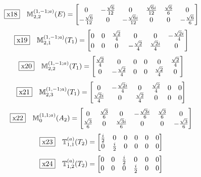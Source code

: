 \documentclass[fleqn,10pt,landscape]{jsarticle}
\begin{document}
\begin{dmath*}
\fbox{x18}\quad \mathbb{M}_{2,2}^{(1,-1;a)}(E)=\begin{bmatrix} 0 & - \frac{\sqrt{6}}{12} & 0 & \frac{\sqrt{6} i}{12} & \frac{\sqrt{6}}{6} & 0 \\ - \frac{\sqrt{6}}{12} & 0 & - \frac{\sqrt{6} i}{12} & 0 & 0 & - \frac{\sqrt{6}}{6} \end{bmatrix}
\end{dmath*}
\begin{dmath*}
\fbox{x19}\quad \mathbb{M}_{2,1}^{(1,-1;a)}(T_{1})=\begin{bmatrix} 0 & 0 & \frac{\sqrt{2}}{4} & 0 & 0 & - \frac{\sqrt{2} i}{4} \\ 0 & 0 & 0 & - \frac{\sqrt{2}}{4} & \frac{\sqrt{2} i}{4} & 0 \end{bmatrix}
\end{dmath*}
\begin{dmath*}
\fbox{x20}\quad \mathbb{M}_{2,2}^{(1,-1;a)}(T_{1})=\begin{bmatrix} \frac{\sqrt{2}}{4} & 0 & 0 & 0 & 0 & \frac{\sqrt{2}}{4} \\ 0 & - \frac{\sqrt{2}}{4} & 0 & 0 & \frac{\sqrt{2}}{4} & 0 \end{bmatrix}
\end{dmath*}
\begin{dmath*}
\fbox{x21}\quad \mathbb{M}_{2,3}^{(1,-1;a)}(T_{1})=\begin{bmatrix} 0 & - \frac{\sqrt{2} i}{4} & 0 & \frac{\sqrt{2}}{4} & 0 & 0 \\ \frac{\sqrt{2} i}{4} & 0 & \frac{\sqrt{2}}{4} & 0 & 0 & 0 \end{bmatrix}
\end{dmath*}
\begin{dmath*}
\fbox{x22}\quad \mathbb{M}_{0}^{(1,1;a)}(A_{2})=\begin{bmatrix} 0 & \frac{\sqrt{3}}{6} & 0 & - \frac{\sqrt{3} i}{6} & \frac{\sqrt{3}}{6} & 0 \\ \frac{\sqrt{3}}{6} & 0 & \frac{\sqrt{3} i}{6} & 0 & 0 & - \frac{\sqrt{3}}{6} \end{bmatrix}
\end{dmath*}
\begin{dmath*}
\fbox{x23}\quad \mathbb{T}_{1,1}^{(a)}(T_{2})=\begin{bmatrix} \frac{i}{2} & 0 & 0 & 0 & 0 & 0 \\ 0 & \frac{i}{2} & 0 & 0 & 0 & 0 \end{bmatrix}
\end{dmath*}
\begin{dmath*}
\fbox{x24}\quad \mathbb{T}_{1,2}^{(a)}(T_{2})=\begin{bmatrix} 0 & 0 & \frac{i}{2} & 0 & 0 & 0 \\ 0 & 0 & 0 & \frac{i}{2} & 0 & 0 \end{bmatrix}
\end{dmath*}
\end{document}
